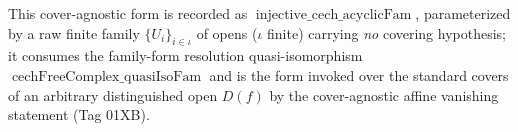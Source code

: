 \begin{lemma}
  This cover-agnostic form is recorded as \(\operatorname{injective\_cech\_acyclicFam}\),
  parameterized by a raw finite family \(\{U_i\}_{i \in \iota}\) of opens
  (\(\iota\) finite) carrying \emph{no} covering hypothesis; it consumes the family-form
  resolution quasi-isomorphism \(\operatorname{cechFreeComplex\_quasiIsoFam}\) and is the
  form invoked over the standard covers of an arbitrary distinguished open \(D(f)\) by the
  cover-agnostic affine vanishing statement (Tag 01XB).
\end{lemma}

